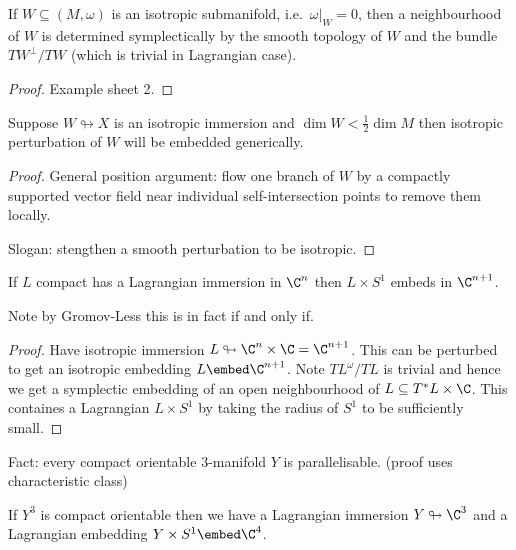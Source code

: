 \documentclass[a4paper]{article}
\newcommand{\immersion}{\looparrowright}
\begin{document}
\begin{proposition}
  If \(W \subseteq (M, \omega)\) is an isotropic submanifold, i.e.\ \(\omega|_W = 0\), then a neighbourhood of \(W\) is determined symplectically by the smooth topology of \(W\) and the bundle \(TW^\perp/TW\) (which is trivial in Lagrangian case).
\end{proposition}

\begin{proof}
  Example sheet 2.
\end{proof}

\begin{lemma}
  Suppose \(W \immersion X\) is an isotropic immersion and \(\dim W < \frac{1}{2} \dim M\) then isotropic perturbation of \(W\) will be embedded generically.
\end{lemma}

\begin{proof}
  General position argument: flow one branch of \(W\) by a compactly supported vector field near individual self-intersection points to remove them locally.

  Slogan: stengthen a smooth perturbation to be isotropic.
\end{proof}

\begin{corollary}
  If \(L\) compact has a Lagrangian immersion in \(\C^n\) then \(L \times S^1\) embeds in \(\C^{n + 1}\).
\end{corollary}

Note by Gromov-Less this is in fact if and only if.

\begin{proof}
  Have isotropic immersion \(L \immersion \C^n \times \C = \C^{n + 1}\). This can be perturbed to get an isotropic embedding \(L \embed \C^{n + 1}\). Note \(TL^\omega/TL\) is trivial and hence we get a symplectic embedding of an open neighbourhood of \(L \subseteq T^*L \times \C\). This containes a Lagrangian \(L \times S^1\) by taking the radius of \(S^1\) to be sufficiently small.
\end{proof}

Fact: every compact orientable \(3\)-manifold \(Y\) is parallelisable. (proof uses characteristic class)

\begin{corollary}
  If \(Y^3\) is compact orientable then we have a Lagrangian immersion \(Y \immersion \C^3\) and a Lagrangian embedding \(Y \times S^1 \embed \C^4\).
\end{corollary}
\end{document}
